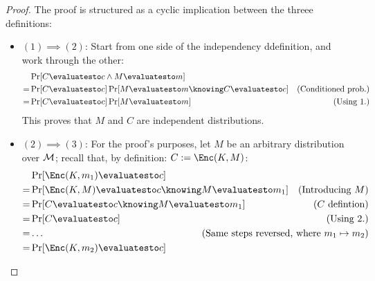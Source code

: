 \begin{proof}
    The proof is structured as a cyclic implication between the threee definitions:
    
    \begin{itemize}
        \item $(1) \implies (2)$: Start from one side of the independency ddefinition, and work through the other:
        \begin{align*}
            & \Pr[C \evaluatesto c \wedge M \evaluatesto m] \\
            =& \Pr[C \evaluatesto c] \Pr[M \evaluatesto m \knowing C \evaluatesto c] & \text{(Conditioned prob.)} \\
            =& \Pr[C \evaluatesto c] \Pr[M \evaluatesto m] & \text{(Using 1.)} \\
        \end{align*}
        This proves that $M$ and $C$ are independent distributions.
        
        \item $(2) \implies (3)$: For the proof's purposes, let $M$ be an arbitrary distribution over $\mathcal{M}$; recall that, by definition: $C := \Enc(K, M)$:
        \begin{align*}
            & \Pr[\Enc(K, m_1) \evaluatesto c] & \\
            =& \Pr[\Enc(K, M) \evaluatesto c \knowing M \evaluatesto m_1] & \text{(Introducing $M$)} \\
            =& \Pr[C \evaluatesto c \knowing M \evaluatesto m_1] & \text{($C$ defintion)} \\
            =& \Pr[C \evaluatesto c] & \text{(Using 2.)} \\
            =& \dots & \mathllap{\text{(Same steps reversed, where $m_1 \mapsto m_2$)}} \\
            =& \Pr[\Enc(K, m_2) \evaluatesto c] & 
        \end{align*}



\end{itemize}
\end{proof}
